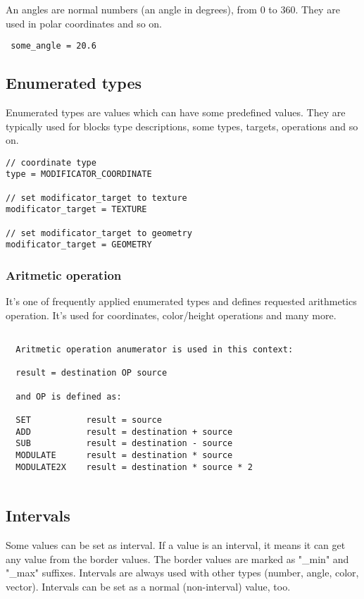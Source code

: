 \documentclass[9pt]{article}
\begin{document}
An angles are normal numbers (an angle in degrees), from 0 to 360. 
They are used in polar coordinates and so on.

\begin{verbatim}
 some_angle = 20.6
\end{verbatim}

\subsection{Enumerated types}

Enumerated types are values which can have some predefined values. 
They are typically used for blocks type descriptions, some types,
targets, operations and so on.

\begin{verbatim}
// coordinate type
type = MODIFICATOR_COORDINATE

// set modificator_target to texture
modificator_target = TEXTURE

// set modificator_target to geometry
modificator_target = GEOMETRY
\end{verbatim}

\subsubsection{Aritmetic operation}

It's one of frequently applied enumerated types and defines requested arithmetics
operation. It's used for coordinates, color/height operations and many more.

\begin{verbatim}  
  
  Aritmetic operation anumerator is used in this context:
  
  result = destination OP source
  
  and OP is defined as:

  SET           result = source
  ADD           result = destination + source
  SUB           result = destination - source
  MODULATE      result = destination * source
  MODULATE2X    result = destination * source * 2
    
\end{verbatim}

\subsection{Intervals}

Some values can be set as interval. If a value is an interval,
it means it can get any value from the border values. The border values
are marked as "\_min" and "\_max" suffixes. Intervals are always used
with other types (number, angle, color, vector). Intervals can be set 
as a normal (non-interval) value, too.
\end{document}
